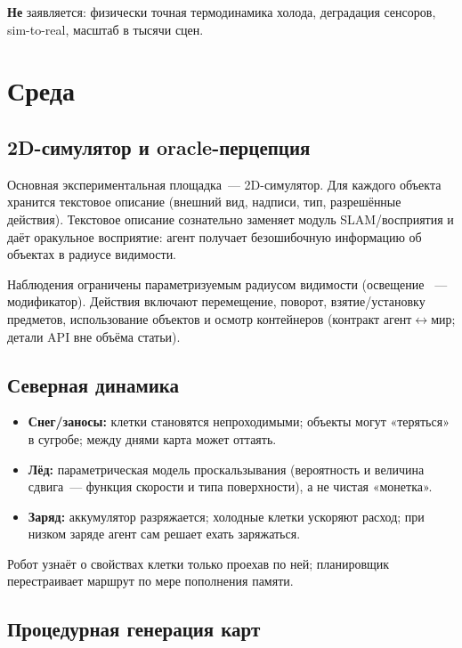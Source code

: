 \documentclass[11pt,a4paper]{article}
\begin{document}
\textbf{Не} заявляется: физически точная термодинамика холода, деградация
сенсоров, sim-to-real, масштаб в тысячи сцен.

\section{Среда}
\label{sec:env}

\subsection{2D-симулятор и oracle-перцепция}

Основная экспериментальная площадка~--- 2D-симулятор.
Для каждого объекта хранится текстовое описание (внешний вид, надписи,
тип, разрешённые действия).
Текстовое описание сознательно заменяет модуль SLAM/восприятия и даёт
оракульное восприятие: агент получает безошибочную информацию об объектах
в радиусе видимости.

Наблюдения ограничены параметризуемым радиусом видимости (освещение~
--- модификатор).
Действия включают перемещение, поворот, взятие/установку предметов,
использование объектов и осмотр контейнеров
(контракт агент\(\leftrightarrow\)мир; детали API вне объёма статьи).

\subsection{Северная динамика}

\begin{itemize}[leftmargin=*]
  \item \textbf{Снег/заносы:} клетки становятся непроходимыми; объекты могут
        «теряться» в сугробе; между днями карта может оттаять.
  \item \textbf{Лёд:} параметрическая модель проскальзывания
        (вероятность и величина сдвига~--- функция скорости и типа поверхности),
        а не чистая «монетка».
  \item \textbf{Заряд:} аккумулятор разряжается; холодные клетки ускоряют расход;
        при низком заряде агент сам решает ехать заряжаться.
\end{itemize}

Робот узнаёт о свойствах клетки только проехав по ней; планировщик
перестраивает маршрут по мере пополнения памяти.

\subsection{Процедурная генерация карт}
\end{document}

